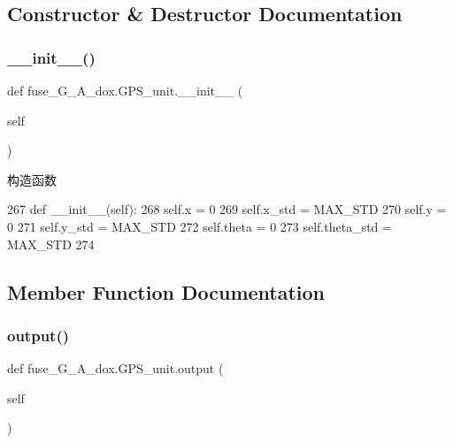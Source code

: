 \subsection{Constructor \& Destructor Documentation}
\mbox{\label{classfuse___g___a__dox_1_1_g_p_s__unit_a1ee1c5d52b638164821db317a238df69}} 
\subsubsection{\texorpdfstring{\+\_\+\+\_\+init\+\_\+\+\_\+()}{\_\_init\_\_()}}
{\footnotesize\ttfamily def fuse\+\_\+\+G\+\_\+\+A\+\_\+dox.\+G\+P\+S\+\_\+unit.\+\_\+\+\_\+init\+\_\+\+\_\+ (\begin{DoxyParamCaption}\item[{}]{self }\end{DoxyParamCaption})}



构造函数 


\begin{DoxyCode}
267     \textcolor{keyword}{def }\_\_init\_\_(self):
268         self.x = 0
269         self.x\_std = MAX\_STD
270         self.y = 0
271         self.y\_std = MAX\_STD
272         self.theta = 0
273         self.theta\_std = MAX\_STD
274 
\end{DoxyCode}


\subsection{Member Function Documentation}
\mbox{\label{classfuse___g___a__dox_1_1_g_p_s__unit_a8eac802afb7e54364521bda5e3fe995f}} 
\subsubsection{\texorpdfstring{output()}{output()}}
{\footnotesize\ttfamily def fuse\+\_\+\+G\+\_\+\+A\+\_\+dox.\+G\+P\+S\+\_\+unit.\+output (\begin{DoxyParamCaption}\item[{}]{self }\end{DoxyParamCaption})}



